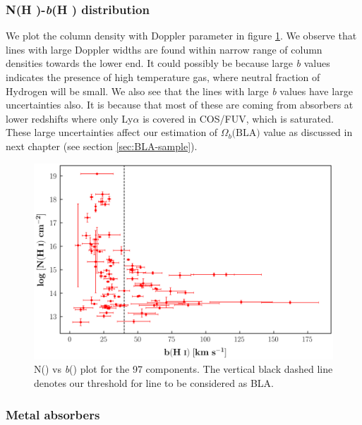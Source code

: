 \subsubsection*{N(H \hspace*{-0.6mm}{\footnotesize I})-\emph{b}(H \hspace*{-0.6mm}{\footnotesize I}) distribution} 

We plot the  column density with Doppler parameter in figure \ref{fig:NHi_bHi}. We observe that lines with large Doppler widths are found within narrow range of column densities towards the lower end. It could possibly be because large \emph{b} values indicates the presence of high temperature gas, where neutral fraction of Hydrogen will be small. We also see that the lines with large \emph{b} values have large uncertainties also. It is because that most of these are coming from absorbers at lower redshifts where only Ly$\alpha$ is covered in COS/FUV, which is saturated. These large uncertainties affect our estimation of $\Omega_b\text{(BLA)}$ value as discussed in next chapter (see section \ref{sec:BLA-sample}). 

\begin{figure}[!h]
    \centering
    \includegraphics[width=\linewidth]{Figures/NHi_vs_bHi.png}
    \caption{N() vs \emph{b}() plot for the 97  components. The vertical black dashed line denotes our threshold for line to be considered as BLA.}
    \label{fig:NHi_bHi}
\end{figure}

\subsubsection{Metal absorbers}

